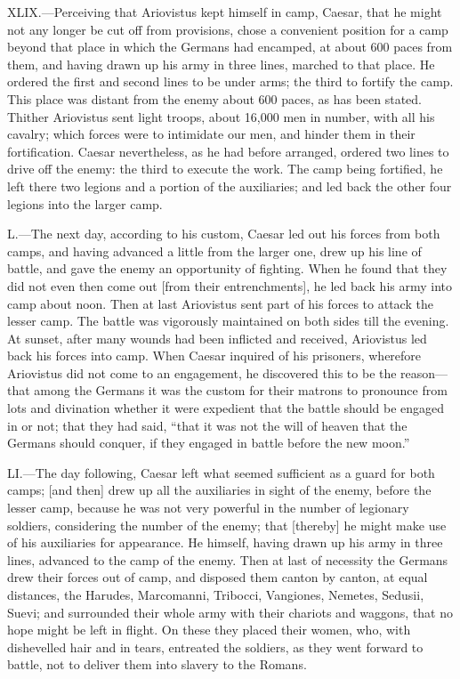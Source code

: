 XLIX.—Perceiving that Ariovistus kept himself in camp, Caesar, that he
might not any longer be cut off from provisions, chose a convenient
position for a camp beyond that place in which the Germans had encamped,
at about 600 paces from them, and having drawn up his army in three
lines, marched to that place. He ordered the first and second lines to
be under arms; the third to fortify the camp. This place was distant
from the enemy about 600 paces, as has been stated. Thither Ariovistus
sent light troops, about 16,000 men in number, with all his cavalry;
which forces were to intimidate our men, and hinder them in their
fortification. Caesar nevertheless, as he had before arranged, ordered
two lines to drive off the enemy: the third to execute the work. The
camp being fortified, he left there two legions and a portion of the
auxiliaries; and led back the other four legions into the larger camp.

L.—The next day, according to his custom, Caesar led out his forces
from both camps, and having advanced a little from the larger one, drew
up his line of battle, and gave the enemy an opportunity of fighting.
When he found that they did not even then come out [from their
entrenchments], he led back his army into camp about noon. Then at last
Ariovistus sent part of his forces to attack the lesser camp. The battle
was vigorously maintained on both sides till the evening. At sunset,
after many wounds had been inflicted and received, Ariovistus led back
his forces into camp. When Caesar inquired of his prisoners, wherefore
Ariovistus did not come to an engagement, he discovered this to be the
reason—that among the Germans it was the custom for their matrons to
pronounce from lots and divination whether it were expedient that the
battle should be engaged in or not; that they had said, ``that it was not
the will of heaven that the Germans should conquer, if they engaged in
battle before the new moon.''

LI.—The day following, Caesar left what seemed sufficient as a guard
for both camps; [and then] drew up all the auxiliaries in sight of the
enemy, before the lesser camp, because he was not very powerful in the
number of legionary soldiers, considering the number of the enemy; that
[thereby] he might make use of his auxiliaries for appearance. He
himself, having drawn up his army in three lines, advanced to the camp
of the enemy. Then at last of necessity the Germans drew their forces
out of camp, and disposed them canton by canton, at equal distances, the
Harudes, Marcomanni, Tribocci, Vangiones, Nemetes, Sedusii, Suevi; and
surrounded their whole army with their chariots and waggons, that no
hope might be left in flight. On these they placed their women, who,
with dishevelled hair and in tears, entreated the soldiers, as they went
forward to battle, not to deliver them into slavery to the Romans.

